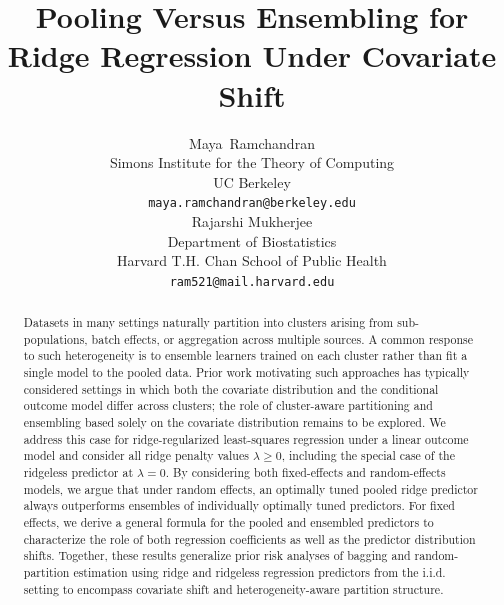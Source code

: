 \documentclass{article}
\title{Pooling Versus Ensembling for Ridge Regression Under Covariate Shift}
\author{%
  Maya~Ramchandran\\
  Simons Institute for the Theory of Computing\\
  UC Berkeley\\
  \texttt{maya.ramchandran@berkeley.edu} \\
  \And
  Rajarshi Mukherjee \\
  Department of Biostatistics\\
  Harvard T.H. Chan School of Public Health \\
  \texttt{ram521@mail.harvard.edu} \\
}
\theoremstyle{plain}
\theoremstyle{remark}
\begin{document}
\maketitle


\begin{abstract}


Datasets in many settings naturally partition into clusters arising from sub-populations, batch effects, or aggregation across multiple sources. A common response to such heterogeneity is to ensemble learners trained on each cluster rather than fit a single model to the pooled data. Prior work motivating such approaches has typically considered settings in which both the covariate distribution and the conditional outcome model differ across clusters; the role of cluster-aware partitioning and ensembling based solely on the covariate distribution remains to be explored. We address this case for ridge-regularized least-squares regression under a linear outcome model and consider all ridge penalty values $\lambda \geq 0$, including the special case of the ridgeless predictor at $\lambda = 0$. By considering both fixed-effects and random-effects models, we argue that under random effects, an optimally tuned pooled ridge predictor always outperforms ensembles of individually optimally tuned predictors. For fixed effects, we derive a general formula for the pooled and ensembled predictors to characterize the role of both regression coefficients as well as the predictor distribution shifts. %
Together, these results generalize prior risk analyses of bagging and random-partition estimation using ridge and ridgeless regression predictors from the i.i.d. setting to encompass covariate shift and heterogeneity-aware partition structure.
\end{abstract}
\end{document}
